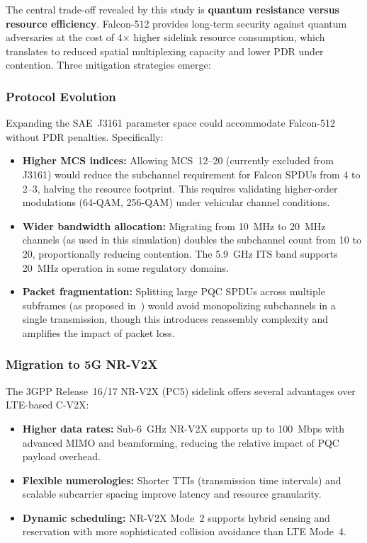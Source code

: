 \documentclass[letterpaper,journal]{IEEEtran}
\begin{document}
The central trade-off revealed by this study is \textbf{quantum resistance versus resource efficiency}. Falcon-512 provides long-term security against quantum adversaries at the cost of 4$\times$ higher sidelink resource consumption, which translates to reduced spatial multiplexing capacity and lower PDR under contention. Three mitigation strategies emerge:

\subsubsection{Protocol Evolution}

Expanding the SAE~J3161 parameter space could accommodate Falcon-512 without PDR penalties. Specifically:
\begin{itemize}
    \item \textbf{Higher MCS indices:} Allowing MCS~12--20 (currently excluded from J3161) would reduce the subchannel requirement for Falcon SPDUs from 4 to 2--3, halving the resource footprint. This requires validating higher-order modulations (64-QAM, 256-QAM) under vehicular channel conditions.
    \item \textbf{Wider bandwidth allocation:} Migrating from 10~MHz to 20~MHz channels (as used in this simulation) doubles the subchannel count from 10 to 20, proportionally reducing contention. The 5.9~GHz ITS band supports 20~MHz operation in some regulatory domains.
    \item \textbf{Packet fragmentation:} Splitting large PQC SPDUs across multiple subframes (as proposed in~\cite{twardokus2025chasm}) would avoid monopolizing subchannels in a single transmission, though this introduces reassembly complexity and amplifies the impact of packet loss.
\end{itemize}

\subsubsection{Migration to 5G NR-V2X}

The 3GPP Release~16/17 NR-V2X (PC5) sidelink offers several advantages over LTE-based C-V2X:
\begin{itemize}
    \item \textbf{Higher data rates:} Sub-6~GHz NR-V2X supports up to 100~Mbps with advanced MIMO and beamforming, reducing the relative impact of PQC payload overhead.
    \item \textbf{Flexible numerologies:} Shorter TTIs (transmission time intervals) and scalable subcarrier spacing improve latency and resource granularity.
    \item \textbf{Dynamic scheduling:} NR-V2X Mode~2 supports hybrid sensing and reservation with more sophisticated collision avoidance than LTE Mode~4.
\end{itemize}
\end{document}
